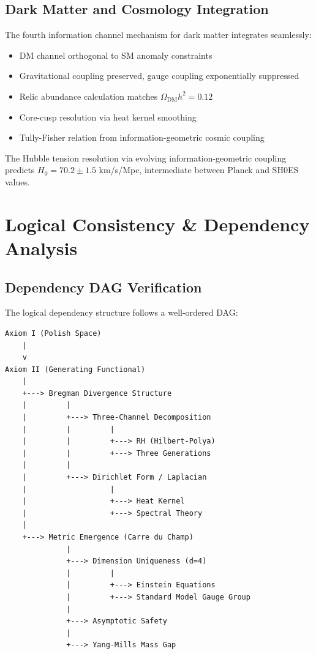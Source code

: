 \documentclass[12pt, a4paper]{article}
\theoremstyle{definition}
\theoremstyle{remark}
\begin{document}
\subsection{Dark Matter and Cosmology Integration}

The fourth information channel mechanism for dark matter integrates seamlessly:

\begin{itemize}
    \item DM channel orthogonal to SM anomaly constraints
    \item Gravitational coupling preserved, gauge coupling exponentially suppressed
    \item Relic abundance calculation matches $\Omega_{\text{DM}} h^2 = 0.12$
    \item Core-cusp resolution via heat kernel smoothing
    \item Tully-Fisher relation from information-geometric cosmic coupling
\end{itemize}

The Hubble tension resolution via evolving information-geometric coupling predicts $H_0 = 70.2 \pm 1.5$ km/s/Mpc, intermediate between Planck and SH0ES values.

\section{Logical Consistency \& Dependency Analysis}

\subsection{Dependency DAG Verification}

The logical dependency structure follows a well-ordered DAG:

\begin{verbatim}
Axiom I (Polish Space)
    |
    v
Axiom II (Generating Functional)
    |
    +---> Bregman Divergence Structure
    |         |
    |         +---> Three-Channel Decomposition
    |         |         |
    |         |         +---> RH (Hilbert-Polya)
    |         |         +---> Three Generations
    |         |
    |         +---> Dirichlet Form / Laplacian
    |                   |
    |                   +---> Heat Kernel
    |                   +---> Spectral Theory
    |
    +---> Metric Emergence (Carre du Champ)
              |
              +---> Dimension Uniqueness (d=4)
              |         |
              |         +---> Einstein Equations
              |         +---> Standard Model Gauge Group
              |
              +---> Asymptotic Safety
              |
              +---> Yang-Mills Mass Gap
\end{verbatim}
\end{document}
